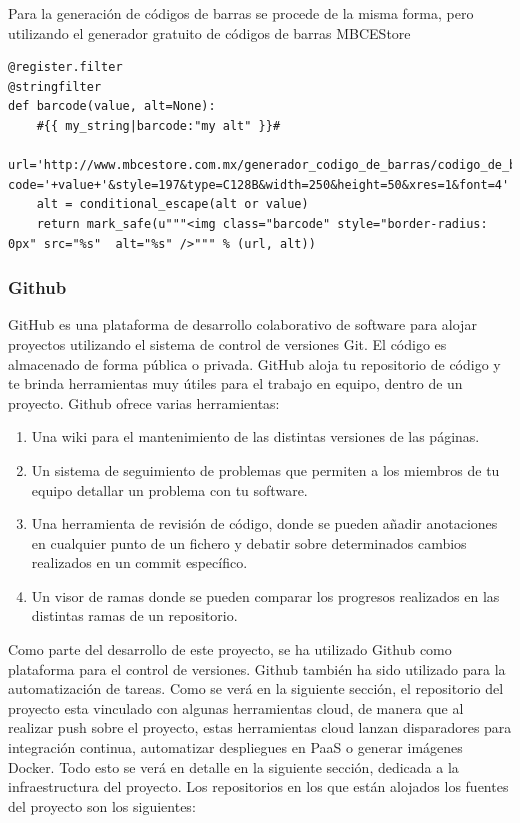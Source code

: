 \documentclass[a4paper,11pt]{book}
\begin{document}
Para la generación de códigos de barras se procede de la misma forma, pero utilizando el generador gratuito de códigos de barras MBCEStore\cite{barras} 

\begin{lstlisting}
@register.filter
@stringfilter
def barcode(value, alt=None):
    #{{ my_string|barcode:"my alt" }}#
    url='http://www.mbcestore.com.mx/generador_codigo_de_barras/codigo_de_barras.html?code='+value+'&style=197&type=C128B&width=250&height=50&xres=1&font=4'
    alt = conditional_escape(alt or value)
    return mark_safe(u"""<img class="barcode" style="border-radius: 0px" src="%s"  alt="%s" />""" % (url, alt))
\end{lstlisting}

\subsubsection{Github}
GitHub\cite{github} es una plataforma de desarrollo colaborativo de software para alojar proyectos utilizando el sistema de control de versiones Git. El código es almacenado de forma pública o privada. GitHub aloja tu repositorio de código y te brinda herramientas muy útiles para el trabajo en equipo, dentro de un proyecto. Github\cite{github2} ofrece varias herramientas:

\begin{enumerate}
\item Una wiki para el mantenimiento de las distintas versiones de las páginas. 
\item Un sistema de seguimiento de problemas que permiten a los miembros de tu equipo detallar un problema con tu software.
\item Una herramienta de revisión de código, donde se pueden añadir anotaciones en cualquier punto de un fichero y debatir sobre determinados cambios realizados en un commit específico. 
\item Un visor de ramas donde se pueden comparar los progresos realizados en las distintas ramas de un repositorio. 
\end{enumerate}

Como parte del desarrollo de este proyecto, se ha utilizado Github como plataforma para el control de versiones. Github también ha sido utilizado para la automatización de tareas. Como se verá en la siguiente sección, el repositorio del proyecto esta vinculado con algunas herramientas cloud, de manera que al realizar push sobre el proyecto, estas herramientas cloud lanzan disparadores para integración continua, automatizar despliegues en PaaS o generar imágenes Docker. Todo esto se verá en detalle en la siguiente sección, dedicada a la infraestructura del proyecto. Los repositorios en los que están alojados los fuentes del proyecto son los siguientes: 
\end{document}
